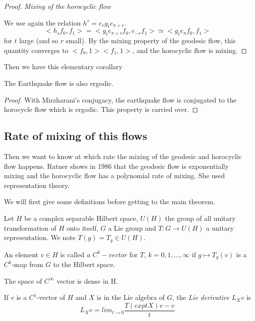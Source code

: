 \begin{proof}
\emph{Mixing of the horocyclic flow}

We use again the relation $h^s = e_r g_t e_{\pi + r}$. \[
<h_s f_0 , f_1 > = < g_t  e_{\pi+r} f_0, e_{-r} f_1> \simeq <g_t e_{\pi} f_0, f_1>
\]
for $t$ large (and so $r$ small). By the mixing property of the geodesic flow, this quantity converges to $<f_0,1><f_1,1>$, and the horocyclic flow is mixing.

\end{proof}


Then we have this elementary corollary

\begin{cor}
The Earthquake flow is also ergodic.
\end{cor}

\begin{proof}
With Mirzharani's conjugacy, the earthquake flow is conjugated to the horocycle flow which is ergodic. This property is carried over.
\end{proof}

\subsection{Rate of mixing of this flows}

Then we want to know at which rate the mixing of the geodesic and horocyclic flow happens. Ratner shows in 1986 \cite{ratner_1987} that the geodesic flow is exponentially mixing and the horocyclic flow has a polynomial rate of mixing. She used representation theory.

We will first give some definitions before getting to the main theorem.

\begin{dfnt}
Let $H$ be a  complex separable Hilbert space, $U(H)$ the group of all unitary transformation of $H$ onto itself, $G$ a Lie group and $T: G \to U(H)$ a unitary representation. We note $T(g)=T_g \in U(H)$.

An element $v \in H$ is called \emph{a $C^k-vector$} for $T$, $k=0,1,...,\infty$ if $g \mapsto T_g(v)$ is a $C^k$-map from $G$ to the Hilbert space.
\end{dfnt}

\begin{rmq}
The space of $C^{\infty}$ vector is dense in H.
\end{rmq}

\begin{dfnt}
If $v$ is a $C^1$-vector of $H$ and $X$ is in the Lie algebra of $G$, the \emph{Lie derivative} $L_X v$ is \[
L_X v =lim_{t \to 0} \frac{T(exp tX)v-v}{t}
\]
\end{dfnt}

